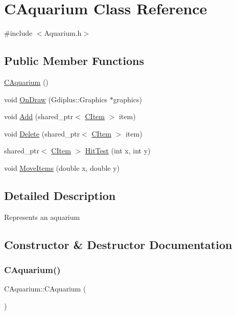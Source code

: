 \hypertarget{class_c_aquarium}{}\section{C\+Aquarium Class Reference}
\label{class_c_aquarium}


{\ttfamily \#include $<$Aquarium.\+h$>$}

\subsection*{Public Member Functions}
\begin{DoxyCompactItemize}
\item 
\mbox{\hyperlink{class_c_aquarium_ab6ba8b1abd87437ff66748e82173a5a8}{C\+Aquarium}} ()
\item 
void \mbox{\hyperlink{class_c_aquarium_a20b4899158d1ba4bc41217630d47e180}{On\+Draw}} (Gdiplus\+::\+Graphics $\ast$graphics)
\item 
void \mbox{\hyperlink{class_c_aquarium_a7c37a9229ac213d1c2bf2eb2d6486722}{Add}} (shared\+\_\+ptr$<$ \mbox{\hyperlink{class_c_item}{C\+Item}} $>$ item)
\item 
void \mbox{\hyperlink{class_c_aquarium_a22fc95040d9f538917345d9e89719cc6}{Delete}} (shared\+\_\+ptr$<$ \mbox{\hyperlink{class_c_item}{C\+Item}} $>$ item)
\item 
shared\+\_\+ptr$<$ \mbox{\hyperlink{class_c_item}{C\+Item}} $>$ \mbox{\hyperlink{class_c_aquarium_a7129486467e76938fbc049723f9187f3}{Hit\+Test}} (int x, int y)
\item 
void \mbox{\hyperlink{class_c_aquarium_a6cc92fa921b94d304933d6ae97524365}{Move\+Items}} (double x, double y)
\end{DoxyCompactItemize}


\subsection{Detailed Description}
Represents an aquarium 

\subsection{Constructor \& Destructor Documentation}
\mbox{\label{class_c_aquarium_ab6ba8b1abd87437ff66748e82173a5a8}} 
\subsubsection{\texorpdfstring{CAquarium()}{CAquarium()}}
{\footnotesize\ttfamily C\+Aquarium\+::\+C\+Aquarium (\begin{DoxyParamCaption}{ }\end{DoxyParamCaption})}

